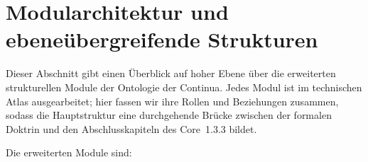 
\section{Modularchitektur und ebeneübergreifende Strukturen}
\label{sec:modules_master}

Dieser Abschnitt gibt einen Überblick auf hoher Ebene über die erweiterten strukturellen
Module der Ontologie der Continua. Jedes Modul ist im technischen Atlas ausgearbeitet;
hier fassen wir ihre Rollen und Beziehungen zusammen, sodass die Hauptstruktur eine durchgehende
Brücke zwischen der formalen Doktrin und den Abschlusskapiteln des Core~1.3.3 bildet.

Die erweiterten Module sind:

